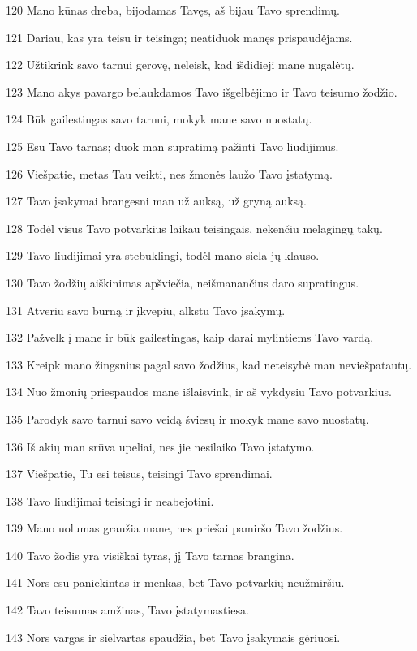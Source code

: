 \par 120 Mano kūnas dreba, bijodamas Tavęs, aš bijau Tavo sprendimų. 
\par 121 Dariau, kas yra teisu ir teisinga; neatiduok manęs prispaudėjams. 
\par 122 Užtikrink savo tarnui gerovę, neleisk, kad išdidieji mane nugalėtų. 
\par 123 Mano akys pavargo belaukdamos Tavo išgelbėjimo ir Tavo teisumo žodžio. 
\par 124 Būk gailestingas savo tarnui, mokyk mane savo nuostatų. 
\par 125 Esu Tavo tarnas; duok man supratimą pažinti Tavo liudijimus. 
\par 126 Viešpatie, metas Tau veikti, nes žmonės laužo Tavo įstatymą. 
\par 127 Tavo įsakymai brangesni man už auksą, už gryną auksą. 
\par 128 Todėl visus Tavo potvarkius laikau teisingais, nekenčiu melagingų takų. 
\par 129 Tavo liudijimai yra stebuklingi, todėl mano siela jų klauso. 
\par 130 Tavo žodžių aiškinimas apšviečia, neišmanančius daro supratingus. 
\par 131 Atveriu savo burną ir įkvepiu, alkstu Tavo įsakymų. 
\par 132 Pažvelk į mane ir būk gailestingas, kaip darai mylintiems Tavo vardą. 
\par 133 Kreipk mano žingsnius pagal savo žodžius, kad neteisybė man neviešpatautų. 
\par 134 Nuo žmonių priespaudos mane išlaisvink, ir aš vykdysiu Tavo potvarkius. 
\par 135 Parodyk savo tarnui savo veidą šviesų ir mokyk mane savo nuostatų. 
\par 136 Iš akių man srūva upeliai, nes jie nesilaiko Tavo įstatymo. 
\par 137 Viešpatie, Tu esi teisus, teisingi Tavo sprendimai. 
\par 138 Tavo liudijimai teisingi ir neabejotini. 
\par 139 Mano uolumas graužia mane, nes priešai pamiršo Tavo žodžius. 
\par 140 Tavo žodis yra visiškai tyras, jį Tavo tarnas brangina. 
\par 141 Nors esu paniekintas ir menkas, bet Tavo potvarkių neužmiršiu. 
\par 142 Tavo teisumas amžinas, Tavo įstatymas­tiesa. 
\par 143 Nors vargas ir sielvartas spaudžia, bet Tavo įsakymais gėriuosi. 

